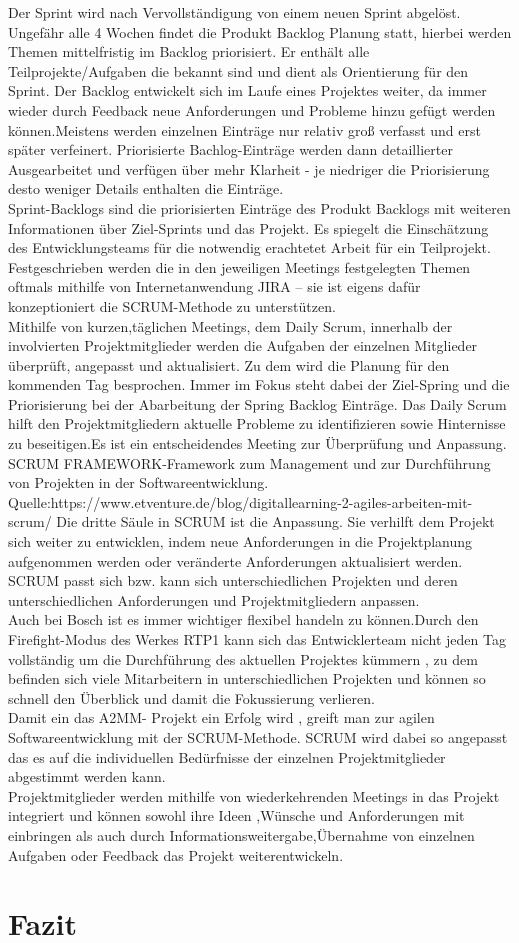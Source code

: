 \documentclass[a4paper, 10pt]{scrartcl}
\begin{document}
Der Sprint wird nach Vervollständigung von einem neuen Sprint abgelöst.
Ungefähr alle 4 Wochen findet die Produkt Backlog Planung statt, hierbei werden Themen mittelfristig im Backlog priorisiert. Er enthält alle Teilprojekte/Aufgaben die bekannt sind und dient als Orientierung für den Sprint. Der Backlog entwickelt sich im Laufe eines Projektes weiter, da immer wieder durch Feedback neue Anforderungen und Probleme hinzu gefügt werden können.Meistens werden einzelnen Einträge nur relativ groß verfasst und erst später verfeinert. Priorisierte Bachlog-Einträge werden dann detaillierter Ausgearbeitet und verfügen über mehr Klarheit - je niedriger die Priorisierung desto weniger Details enthalten die Einträge.\\
Sprint-Backlogs sind die priorisierten Einträge des Produkt Backlogs mit weiteren Informationen über Ziel-Sprints und das Projekt. Es spiegelt die Einschätzung des Entwicklungsteams für die notwendig erachtetet Arbeit für ein Teilprojekt.
Festgeschrieben werden die in den jeweiligen Meetings festgelegten Themen oftmals  mithilfe von Internetanwendung JIRA – sie ist eigens dafür konzeptioniert die SCRUM-Methode zu unterstützen.\\
Mithilfe von kurzen,täglichen Meetings, dem Daily Scrum, innerhalb der involvierten Projektmitglieder werden die Aufgaben der einzelnen Mitglieder überprüft, angepasst und aktualisiert. Zu dem wird die Planung für den kommenden Tag besprochen. Immer im Fokus steht dabei der Ziel-Spring und die Priorisierung bei der Abarbeitung der Spring Backlog Einträge. Das Daily Scrum hilft den Projektmitgliedern aktuelle Probleme zu identifizieren sowie Hinternisse zu beseitigen.Es ist ein entscheidendes Meeting zur Überprüfung und Anpassung.\\
SCRUM FRAMEWORK-Framework zum Management und zur Durchführung von Projekten in der Softwareentwicklung. Quelle:https://www.etventure.de/blog/digitallearning-2-agiles-arbeiten-mit-scrum/
Die dritte Säule in SCRUM ist die Anpassung. Sie verhilft dem Projekt sich weiter zu entwicklen, indem neue Anforderungen in die Projektplanung aufgenommen werden oder veränderte Anforderungen aktualisiert werden. SCRUM passt sich bzw. kann sich unterschiedlichen Projekten und deren unterschiedlichen Anforderungen und Projektmitgliedern anpassen.\\
Auch bei Bosch ist es immer wichtiger flexibel handeln zu können.Durch den Firefight-Modus des Werkes RTP1 kann sich das Entwicklerteam nicht jeden Tag vollständig um die Durchführung des aktuellen Projektes kümmern , zu dem befinden sich viele Mitarbeitern in unterschiedlichen Projekten und können so schnell den Überblick und damit die Fokussierung verlieren.\\
Damit ein das A2MM- Projekt ein Erfolg wird , greift man zur agilen Softwareentwicklung mit der SCRUM-Methode. SCRUM wird dabei so angepasst das es auf die individuellen Bedürfnisse der einzelnen Projektmitglieder abgestimmt werden kann.\\
Projektmitglieder werden mithilfe von wiederkehrenden Meetings in das Projekt integriert und können sowohl ihre Ideen ,Wünsche und Anforderungen mit einbringen als auch durch Informationsweitergabe,Übernahme von einzelnen Aufgaben oder Feedback das Projekt weiterentwickeln.

\section{Fazit}
\end{document}

